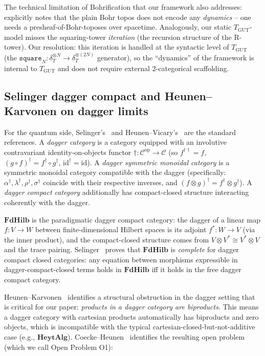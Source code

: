 \documentclass[11pt,a4paper]{article}
\theoremstyle{plain}
\theoremstyle{definition}
\theoremstyle{remark}
\newcommand{\cat}[1]{\mathbf{#1}}
\newcommand{\HeytAlg}{\cat{HeytAlg}}
\newcommand{\FdHilb}{\cat{FdHilb}}
\newcommand{\op}{\mathrm{op}}
\newcommand{\id}{\mathrm{id}}
\newcommand{\TGUT}{T_{\mathrm{GUT}}}
\begin{document}
The technical limitation of Bohrification that our framework also addresses: \cite[\S11]{HLS09} explicitly notes that the plain Bohr topos does not encode any \emph{dynamics} -- one needs a presheaf-of-Bohr-toposes over spacetime. Analogously, our static $\TGUT$-model misses the squaring-tower \emph{iteration} (the recursion structure of the R-tower). Our resolution: this iteration is handled at the syntactic level of $\TGUT$ (the $\texttt{square}_N : \delta_T^{\otimes N} \to \delta_T^{\otimes(2N)}$ generator), so the ``dynamics'' of the framework is internal to $\TGUT$ and does not require external 2-categorical scaffolding.

\subsection{Selinger dagger compact and Heunen--Karvonen on dagger limits}\label{sec:background:dagger}

For the quantum side, Selinger's~\cite{Sel07} and Heunen--Vicary's~\cite{HV19} are the standard references. A \emph{dagger category} is a category equipped with an involutive contravariant identity-on-objects functor $\dagger : \mathcal{C}^{\op} \to \mathcal{C}$ (so $f^{\dagger\dagger} = f$, $(g \circ f)^{\dagger} = f^{\dagger} \circ g^{\dagger}$, $\id^{\dagger} = \id$). A \emph{dagger symmetric monoidal category} is a symmetric monoidal category compatible with the dagger (specifically: $\alpha^{\dagger}, \lambda^{\dagger}, \rho^{\dagger}, \sigma^{\dagger}$ coincide with their respective inverses, and $(f \otimes g)^{\dagger} = f^{\dagger} \otimes g^{\dagger}$). A \emph{dagger compact category} additionally has compact-closed structure interacting coherently with the dagger.

$\FdHilb$ is the paradigmatic dagger compact category: the dagger of a linear map $f : V \to W$ between finite-dimensional Hilbert spaces is its adjoint $f^* : W \to V$ (via the inner product), and the compact-closed structure comes from $V \otimes V^* \cong V^* \otimes V$ and the trace pairing. Selinger~\cite{Sel12} proves that $\FdHilb$ is \emph{complete} for dagger compact closed categories: any equation between morphisms expressible in dagger-compact-closed terms holds in $\FdHilb$ iff it holds in the free dagger compact category.

Heunen--Karvonen~\cite{HK19} identifies a structural obstruction in the dagger setting that is critical for our paper: \emph{products in a dagger category are biproducts}. This means a dagger category with cartesian products automatically has biproducts and zero objects, which is incompatible with the typical cartesian-closed-but-not-additive case (e.g., $\HeytAlg$). Coecke--Heunen~\cite{CH16} identifies the resulting open problem (which we call Open Problem O1):
\end{document}
